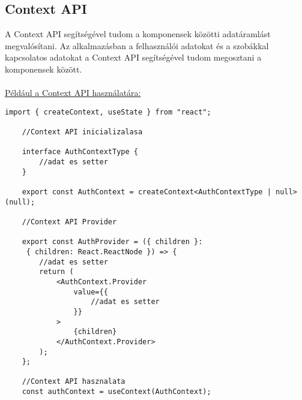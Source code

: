 \subsection*{Context API}
A Context API segítségével tudom a komponensek közötti adatáramlást megvalósítani.
Az alkalmazásban a felhasználói adatokat és a szobákkal kapcsolatos adatokat a Context API segítségével tudom megosztani a komponensek között.
\\
\\
\underline{Például a Context API használatára:}
\begin{lstlisting}[style=es6,caption={Context API}]
    import { createContext, useState } from "react";

    //Context API inicializalasa
    
    interface AuthContextType {
        //adat es setter
    }

    export const AuthContext = createContext<AuthContextType | null>(null);

    //Context API Provider

    export const AuthProvider = ({ children }:
     { children: React.ReactNode }) => {
        //adat es setter
        return (
            <AuthContext.Provider
                value={{
                    //adat es setter
                }}
            >
                {children}
            </AuthContext.Provider>
        );
    };

    //Context API hasznalata
    const authContext = useContext(AuthContext);
\end{lstlisting}
\vspace{1em}
